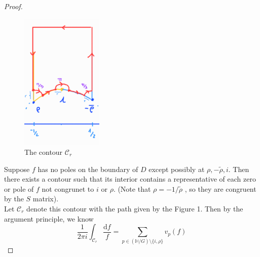 \documentclass[12pt]{article}
\theoremstyle{definition}
\begin{document}
\begin{proof}~\\
    \begin{figure}[H]
        \centering
        \includegraphics[width=0.35\textwidth]{Fig1.png}
        \caption{The contour \(\mathcal{C}_r\) }
    \end{figure}
Suppose \(f\) has no poles on the boundary of \(D\) except possibly at \(\rho ,-\widetilde{\rho },i \). Then there exists a contour such that its interior contains a representative of each zero or pole of \(f\) not congrunet to \(i\) or \(\rho \). (Note that \(\rho = -1/\widetilde{\rho } \) , so they are congruent by the \(S\) matrix). \\
Let \(\mathcal{C}_{r} \) denote this contour with the path given by the Figure 1. Then by the argument principle, we know 
\[
    \frac{1}{2\pi i}\int_{\mathcal{C}_{r}} \frac{\mathrm{d} f}{f} = \sum_{p\in (\mathbb{H}/G )\setminus \{i,\rho \} } v_p(f) 
\]


\end{proof}
\end{document}
